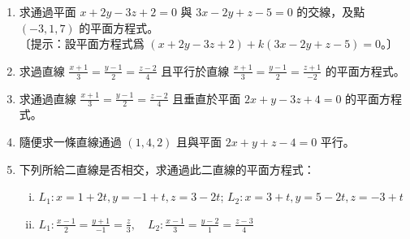 \begin{enumerate}
\item[*10.] 求通過平面 $x + 2y - 3z + 2 = 0$ 與 $3x - 2y + z - 5 = 0$ 的交線，及點 $(-3, 1, 7)$ 的平面方程式。\\
  〔提示：設平面方程式爲 $(x + 2y - 3z + 2) + k(3x - 2y + z - 5) = 0$。〕

\item[*11.] 求過直線 $\frac{x+1}{3} = \frac{y-1}{2} = \frac{z-2}{4}$ 且平行於直線 $\frac{x+1}{3} = \frac{y-1}{2} = \frac{z+1}{-2}$ 的平面方程式。

\item[*12.] 求通過直線 $\frac{x+1}{3} = \frac{y-1}{2} = \frac{z-2}{4}$ 且垂直於平面 $2x + y - 3z + 4 = 0$ 的平面方程式。

\item 隨便求一條直線通過 $(1, 4, 2)$ 且與平面 $2x + y + z - 4 = 0$ 平行。

\item 下列所給二直線是否相交，求通過此二直線的平面方程式：
  \begin{enumerate}[(i)]
    \item $L_1 : x = 1 + 2t, y = -1 + t, z = 3 - 2t$; \quad $L_2 : x = 3 + t, y = 5 - 2t, z = -3 + t$
    \item $L_1 : \frac{x-1}{2} = \frac{y+1}{-1} = \frac{z}{3}, \quad L_2 : \frac{x-1}{3} = \frac{y-2}{1} = \frac{z-3}{4}$
  \end{enumerate}
\end{enumerate}

